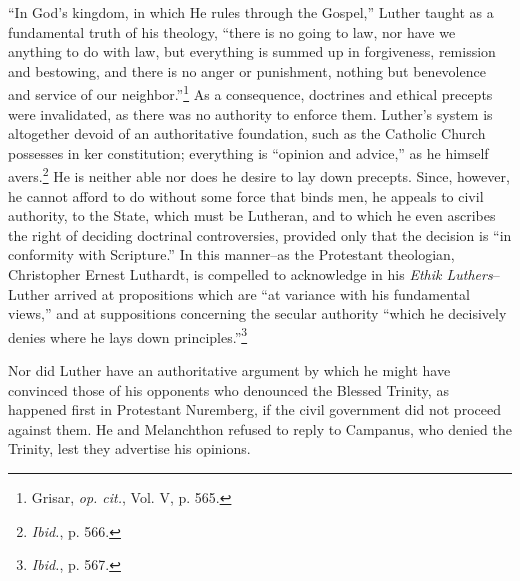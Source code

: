 “In God’s kingdom, in which He rules through the Gospel,” Luther taught
as a fundamental truth of his theology, “there is no going
to law, nor have we anything to do with law, but everything is
summed up in forgiveness, remission and bestowing, and there is no
anger or punishment, nothing but benevolence and service of our
neighbor.”\footnote{Grisar, \textit{op. cit.}, Vol. V, p. 565.}
 As a consequence, doctrines and ethical precepts were
invalidated, as there was no authority to enforce them. Luther’s system
is altogether devoid of an authoritative foundation, such as the
Catholic Church possesses in ker constitution; everything is “opinion
and advice,” as he himself avers.\footnote{\textit{Ibid.}, p. 566.}
 He is neither able nor does he desire
to lay down precepts. Since, however, he cannot afford to do without
some force that binds men, he appeals to civil authority, to the State,
which must be Lutheran, and to which he even ascribes the right of
deciding doctrinal controversies, provided only that the decision is
“in conformity with Scripture.” In this manner--as the Protestant
theologian, Christopher Ernest Luthardt, is compelled to acknowledge
in his \textit{Ethik Luthers}--Luther arrived at propositions which are “at
variance with his fundamental views,” and at suppositions concerning the
secular authority “which he decisively denies where he lays
down principles.”\footnote{\textit{Ibid.}, p. 567.}

Nor did Luther have an authoritative argument by which he might
have convinced those of his opponents who denounced the Blessed
Trinity, as happened first in Protestant Nuremberg, if the civil government
did not proceed against them. He and Melanchthon refused
to reply to Campanus, who denied the Trinity, lest they advertise his
opinions.

